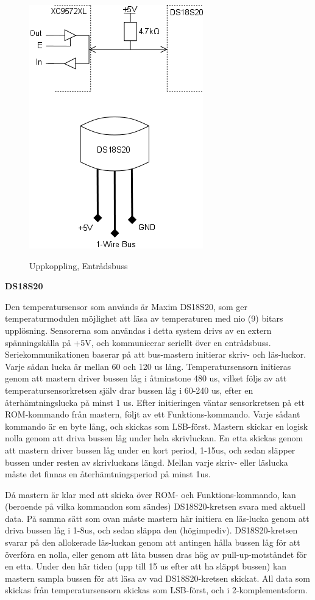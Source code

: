 \documentclass[a4paper,11pt]{article}
\begin{document}
	\begin{figure}[ht!tb]
	  \centering
	      \includegraphics[scale=1, angle=0]{TempBus.png}
		\label{fig:TempBus}
	  	\caption{Uppkoppling, Entrådsbuss}
	\end{figure}

{\noindent \bf DS18S20}

Den temperatursensor som används är Maxim DS18S20, som ger temperaturmodulen möjlighet att läsa av temperaturen
med nio (9) bitars upplösning. Sensorerna som användas i detta system drivs av en extern spänningskälla på +5V,
och kommunicerar seriellt över en entrådsbuss. Seriekommunikationen baserar på att bus-mastern initierar skriv-
och läs-luckor. Varje sådan lucka är mellan 60 och 120 us lång. Temperatursensorn initieras genom att mastern
driver bussen låg i åtminstone 480 us, vilket följs av att temperatursensorkretsen själv drar bussen låg i 60-240 us,
efter en återhämtningslucka på minst 1 us. Efter initieringen väntar sensorkretsen på ett ROM-kommando från mastern,
följt av ett Funktions-kommando. Varje sådant kommando är en byte lång, och skickas som LSB-först. Mastern skickar
en logisk nolla genom att driva bussen låg under hela skrivluckan. En etta skickas genom att mastern driver bussen låg
under en kort period, 1-15us, och sedan släpper bussen under resten av skrivluckans längd. Mellan varje skriv- eller läslucka
måste det finnas en återhämtningsperiod på minst 1us.

Då mastern är klar med att skicka över ROM- och Funktions-kommando, kan (beroende på vilka kommandon som sändes) DS18S20-kretsen
svara med aktuell data. På samma sätt som ovan måste mastern här initiera en läs-lucka genom att driva bussen låg i 1-8us, och
sedan släppa den (högimpediv). DS18S20-kretsen svarar på den allokerade läs-luckan genom att antingen hålla bussen låg för att
överföra en nolla, eller genom att låta bussen dras hög av pull-up-motståndet för en etta. Under den här tiden (upp till 15 us
efter att ha släppt bussen) kan mastern sampla bussen för att läsa av vad DS18S20-kretsen skickat. All data som skickas från
temperatursensorn skickas som LSB-först, och i 2-komplementsform.\\
\end{document}
